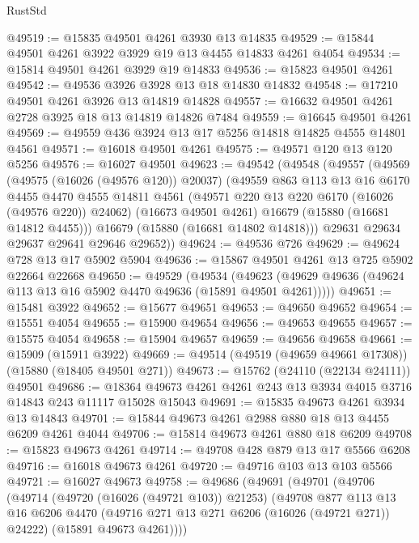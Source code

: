 \begin{lexlean}{RustStd}
\begin{coremodule}
@49519 := @15835 @49501 @4261 @3930 @13 @14835
@49529 := @15844 @49501 @4261 @3922 @3929 @19 @13 @4455 @14833 @4261 @4054
@49534 := @15814 @49501 @4261 @3929 @19 @14833
@49536 := @15823 @49501 @4261
@49542 := @49536 @3926 @3928 @13 @18 @14830 @14832
@49548 := @17210 @49501 @4261 @3926 @13 @14819 @14828
@49557 := @16632 @49501 @4261 @2728 @3925 @18 @13 @14819 @14826 @7484
@49559 := @16645 @49501 @4261
@49569 := @49559 @436 @3924 @13 @17 @5256 @14818 @14825 @4555 @14801 @4561
@49571 := @16018 @49501 @4261
@49575 := @49571 @120 @13 @120 @5256
@49576 := @16027 @49501
@49623 := @49542
    (@49548
      (@49557
        (@49569
          (@49575 (@16026 (@49576 @120)) @20037)
          (@49559
            @863
            @113
            @13
            @16
            @6170
            @4455
            @4470
            @4555
            @14811
            @4561
            (@49571 @220 @13 @220 @6170 (@16026 (@49576 @220)) @24062)
            (@16673 @49501 @4261)
            @16679
            (@15880 (@16681 @14812 @4455)))
          @16679
          (@15880 (@16681 @14802 @14818)))
        @29631
        @29634
        @29637
        @29641
        @29646
        @29652))
@49624 := @49536 @726
@49629 := @49624 @728 @13 @17 @5902 @5904
@49636 := @15867 @49501 @4261 @13 @725 @5902 @22664 @22668
@49650 := @49529
    (@49534 (@49623 (@49629 @49636 (@49624 @113 @13 @16 @5902 @4470 @49636 (@15891 @49501 @4261)))))
@49651 := @15481 @3922
@49652 := @15677 @49651
@49653 := @49650 @49652
@49654 := @15551 @4054
@49655 := @15900 @49654
@49656 := @49653 @49655
@49657 := @15575 @4054
@49658 := @15904 @49657
@49659 := @49656 @49658
@49661 := @15909 (@15911 @3922)
@49669 := @49514 (@49519 (@49659 @49661 @17308)) (@15880 (@18405 @49501 @271))
@49673 := @15762 (@24110 (@22134 @24111)) @49501
@49686 := @18364 @49673 @4261 @4261 @243 @13 @3934 @4015 @3716 @14843 @243 @11117 @15028 @15043
@49691 := @15835 @49673 @4261 @3934 @13 @14843
@49701 := @15844 @49673 @4261 @2988 @880 @18 @13 @4455 @6209 @4261 @4044
@49706 := @15814 @49673 @4261 @880 @18 @6209
@49708 := @15823 @49673 @4261
@49714 := @49708 @428 @879 @13 @17 @5566 @6208
@49716 := @16018 @49673 @4261
@49720 := @49716 @103 @13 @103 @5566
@49721 := @16027 @49673
@49758 := @49686
    (@49691
      (@49701
        (@49706
          (@49714
            (@49720 (@16026 (@49721 @103)) @21253)
            (@49708
              @877
              @113
              @13
              @16
              @6206
              @4470
              (@49716 @271 @13 @271 @6206 (@16026 (@49721 @271)) @24222)
              (@15891 @49673 @4261))))

\end{coremodule}
\end{lexlean}
